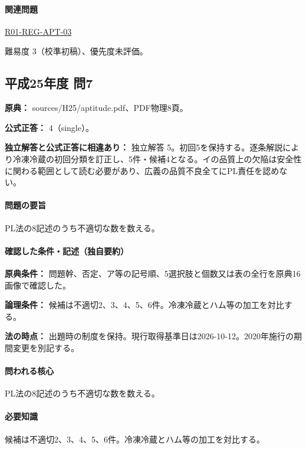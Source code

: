 \paragraph{関連問題} \hyperref[q:r01-reg-apt-03]{R01-REG-APT-03}

\par 難易度 3（校準初稿）、優先度未評価。

\subsection{平成25年度 問7}
\label{q:h25-reg-apt-07}

\noindent\textbf{原典：} sources/H25/aptitude.pdf、PDF物理8頁。

\textbf{公式正答：} 4（single）。

\par\textbf{独立解答と公式正答に相違あり：} 独立解答 5。初回5を保持する。逐条解説により冷凍冷蔵の初回分類を訂正し、5件・候補4となる。イの品質上の欠陥は安全性に関わる範囲として読む必要があり、広義の品質不良全てにPL責任を認めない。

\paragraph{問題の要旨} PL法の8記述のうち不適切な数を数える。

\paragraph{確認した条件・記述（独自要約）}\mbox{}\par

\noindent\textbf{原典条件：} 問題幹、否定、ア等の記号順、5選択肢と個数又は表の全行を原典16画像で確認した。\par

\noindent\textbf{論理条件：} 候補は不適切2、3、4、5、6件。冷凍冷蔵とハム等の加工を対比する。\par

\noindent\textbf{法の時点：} 出題時の制度を保持。現行取得基準日は2026-10-12。2020年施行の期間変更を別記する。\par

\paragraph{問われる核心} PL法の8記述のうち不適切な数を数える。

\paragraph{必要知識} 候補は不適切2、3、4、5、6件。冷凍冷蔵とハム等の加工を対比する。

